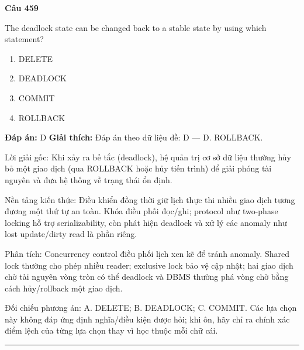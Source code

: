 \documentclass[11pt,a4paper]{article}
\newenvironment{question}[1]{%
  \par\vspace{1em}\noindent\textbf{\large Câu #1}\par\vspace{0.4em}
}{%
  \par\vspace{1em}\hrule\vspace{0.6em}
}
\newenvironment{choices}{%
  \begin{enumerate}[label=\textbf{\Alph*.},leftmargin=2.2em,itemsep=2pt,topsep=3pt]
}{%
  \end{enumerate}
}
\newcommand{\choice}{\item}
\begin{document}
\begin{question}{459}
The deadlock state can be changed back to a stable state by using which statement?
\begin{choices}
\choice DELETE
\choice DEADLOCK
\choice COMMIT
\choice ROLLBACK
\end{choices}
\textbf{Đáp án:} D
\textbf{Giải thích:} Đáp án theo dữ liệu đề: D — D. ROLLBACK.

Lời giải gốc: Khi xảy ra bế tắc (deadlock), hệ quản trị cơ sở dữ liệu thường hủy bỏ một giao dịch (qua ROLLBACK hoặc hủy tiến trình) để giải phóng tài nguyên và đưa hệ thống về trạng thái ổn định.

Nền tảng kiến thức: Điều khiển đồng thời giữ lịch thực thi nhiều giao dịch tương đương một thứ tự an toàn. Khóa điều phối đọc/ghi; protocol như two-phase locking hỗ trợ serializability, còn phát hiện deadlock và xử lý các anomaly như lost update/dirty read là phần riêng.

Phân tích: Concurrency control điều phối lịch xen kẽ để tránh anomaly. Shared lock thường cho phép nhiều reader; exclusive lock bảo vệ cập nhật; hai giao dịch chờ tài nguyên vòng tròn có thể deadlock và DBMS thường phá vòng chờ bằng cách hủy/rollback một giao dịch.

Đối chiếu phương án: A. DELETE; B. DEADLOCK; C. COMMIT. Các lựa chọn này không đáp ứng định nghĩa/điều kiện được hỏi; khi ôn, hãy chỉ ra chính xác điểm lệch của từng lựa chọn thay vì học thuộc mỗi chữ cái.
\end{question}
\end{document}
